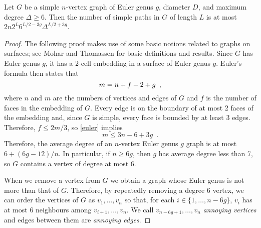\documentclass{patmorin}
\begin{document}
\begin{lem}
   Let $G$ be a simple $n$-vertex graph of Euler genus $g$, diameter
   $D$, and maximum degree $\Delta\ge 6$. Then the number of simple paths
   in $G$ of length $L$ is at most $2n2^{L}6^{L/2-3g}\Delta^{L/2+3g}$.
\end{lem}

\begin{proof}
   The following proof makes use of some basic notions related to graphs
   on surfaces; see Mohar and Thomassen \cite{mohar.thomassen:graphs} for
   basic definitions and results.  Since $G$ has Euler genus $g$, it has
   a 2-cell embedding in a surface of Euler genus $g$.  Euler's formula
   then states that
   \begin{equation}
      m = n+f-2+g \enspace ,  \eqlabel{euler}
   \end{equation}
   where $n$ and $m$ are the numbers of vertices and edges of
   $G$ and $f$ is the number of faces in the embedding of $G$.  
   Every edge is on the boundary of at most 2 faces of the embedding
   and, since $G$ is simple, 
   every face is
   bounded by at least 3 edges.  Therefore, $f \le 2m/3$, so \eqref{euler}
   implies
   \[
       m\le 3n-6+3g \enspace .
   \]
   Therefore, the average degree of an $n$-vertex Euler genus $g$ graph
   is at most $6+(6g-12)/n$.  In particular, if $n \ge 6g$, then $g$
   has average degree less than 7, so $G$ contains a vertex of degree
   at most $6$.
  
   When we remove a vertex from $G$ we obtain a graph whose Euler genus is
   not more than that of $G$.  Therefore, by repeatedly removing a degree
   6 vertex, we can order the vertices of $G$ as $v_1,\ldots,v_n$ so that,
   for each $i\in\{1,\ldots,n-6g\}$, $v_i$ has at most 6 neighbours among
   $v_{i+1},\ldots,v_n$.  We call $v_{n-6g+1},\ldots,v_n$ \emph{annoying
   vertices} and edges between them are \emph{annoying edges}.


\end{proof}
\end{document}

